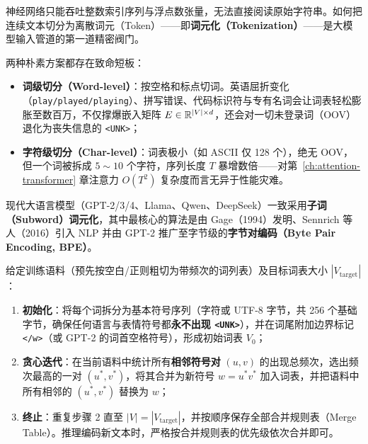 神经网络只能吞吐整数索引序列与浮点数张量，无法直接阅读原始字符串。如何把连续文本切分为离散词元（Token）——即\textbf{词元化（Tokenization）}——是大模型输入管道的第一道精密阀门。

两种朴素方案都存在致命短板：
\begin{itemize}
  \item \textbf{词级切分（Word-level）}：按空格和标点切词。英语屈折变化（\texttt{play/played/playing}）、拼写错误、代码标识符与专有名词会让词表轻松膨胀至数百万，不仅撑爆嵌入矩阵 $E \in \mathbb{R}^{|V|\times d}$，还会对一切未登录词（OOV）退化为丧失信息的 \texttt{<UNK>}；
  \item \textbf{字符级切分（Char-level）}：词表极小（如 ASCII 仅 128 个），绝无 OOV，但一个词被拆成 $5\sim 10$ 个字符，序列长度 $T$ 暴增数倍——对第~\ref{ch:attention-transformer} 章注意力 $O(T^2)$ 复杂度而言无异于性能灾难。
\end{itemize}

现代大语言模型（GPT-2/3/4、Llama、Qwen、DeepSeek）一致采用\textbf{子词（Subword）词元化}，其中最核心的算法是由 Gage（1994）发明、Sennrich 等人（2016）引入 NLP 并由 GPT-2 推广至字节级的\textbf{字节对编码（Byte Pair Encoding, BPE）}。

\begin{defBox}
\begin{definition}
给定训练语料（预先按空白/正则粗切为带频次的词列表）及目标词表大小 $|V_{\text{target}}|$：
\begin{enumerate}
  \item \textbf{初始化}：将每个词拆分为基本符号序列（字符或 UTF-8 字节，共 256 个基础字节，确保任何语言与表情符号都\textbf{永不出现 \texttt{<UNK>}}），并在词尾附加边界标记 \texttt{</w>}（或 GPT-2 的词首空格符号），形成初始词表 $V_0$；
  \item \textbf{贪心迭代}：在当前语料中统计所有\textbf{相邻符号对} $(u, v)$ 的出现总频次，选出频次最高的一对 $(u^*, v^*)$，将其合并为新符号 $w = u^* v^*$ 加入词表，并把语料中所有相邻的 $(u^*, v^*)$ 替换为 $w$；
  \item \textbf{终止}：重复步骤 2 直至 $|V| = |V_{\text{target}}|$，并按顺序保存全部合并规则表（Merge Table）。推理编码新文本时，严格按合并规则表的优先级依次合并即可。
\end{enumerate}
\end{definition}
\end{defBox}


